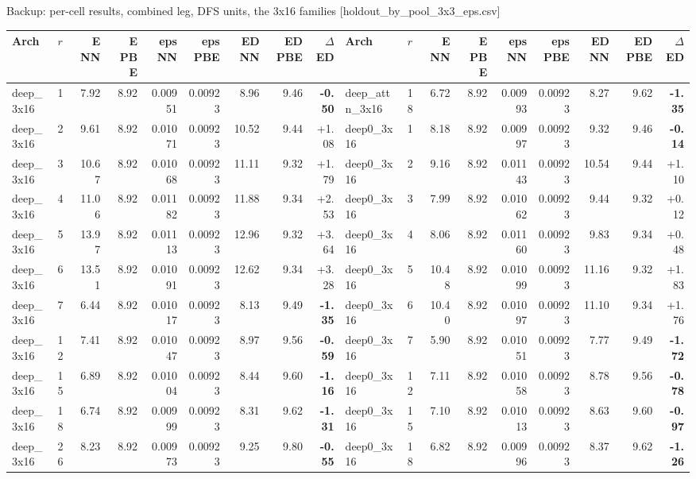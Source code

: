 \begin{frame}[label=b6]{Backup: per-cell results, combined leg, DFS units, the 3x16 families [holdout\_by\_pool\_3x3\_eps.csv]}
  \begin{center}\tiny\setlength{\tabcolsep}{2.2pt}
  \begin{tabular}{llrrrrrrr|llrrrrrrr}
  \toprule
  Arch & $r$ & E NN & E PBE & eps NN & eps PBE & ED NN & ED PBE & $\Delta$ED & Arch & $r$ & E NN & E PBE & eps NN & eps PBE & ED NN & ED PBE & $\Delta$ED \\ \midrule
  deep\_3x16 & 1 & 7.92 & 8.92 & 0.00951 & 0.00923 & 8.96 & 9.46 & \textbf{-0.50} & deep\_attn\_3x16 & 18 & 6.72 & 8.92 & 0.00993 & 0.00923 & 8.27 & 9.62 & \textbf{-1.35} \\
  deep\_3x16 & 2 & 9.61 & 8.92 & 0.01071 & 0.00923 & 10.52 & 9.44 & +1.08 & deep0\_3x16 & 1 & 8.18 & 8.92 & 0.00997 & 0.00923 & 9.32 & 9.46 & \textbf{-0.14} \\
  deep\_3x16 & 3 & 10.67 & 8.92 & 0.01068 & 0.00923 & 11.11 & 9.32 & +1.79 & deep0\_3x16 & 2 & 9.16 & 8.92 & 0.01143 & 0.00923 & 10.54 & 9.44 & +1.10 \\
  deep\_3x16 & 4 & 11.06 & 8.92 & 0.01182 & 0.00923 & 11.88 & 9.34 & +2.53 & deep0\_3x16 & 3 & 7.99 & 8.92 & 0.01062 & 0.00923 & 9.44 & 9.32 & +0.12 \\
  deep\_3x16 & 5 & 13.97 & 8.92 & 0.01113 & 0.00923 & 12.96 & 9.32 & +3.64 & deep0\_3x16 & 4 & 8.06 & 8.92 & 0.01160 & 0.00923 & 9.83 & 9.34 & +0.48 \\
  deep\_3x16 & 6 & 13.51 & 8.92 & 0.01091 & 0.00923 & 12.62 & 9.34 & +3.28 & deep0\_3x16 & 5 & 10.48 & 8.92 & 0.01099 & 0.00923 & 11.16 & 9.32 & +1.83 \\
  deep\_3x16 & 7 & 6.44 & 8.92 & 0.01017 & 0.00923 & 8.13 & 9.49 & \textbf{-1.35} & deep0\_3x16 & 6 & 10.40 & 8.92 & 0.01097 & 0.00923 & 11.10 & 9.34 & +1.76 \\
  deep\_3x16 & 12 & 7.41 & 8.92 & 0.01047 & 0.00923 & 8.97 & 9.56 & \textbf{-0.59} & deep0\_3x16 & 7 & 5.90 & 8.92 & 0.01051 & 0.00923 & 7.77 & 9.49 & \textbf{-1.72} \\
  deep\_3x16 & 15 & 6.89 & 8.92 & 0.01004 & 0.00923 & 8.44 & 9.60 & \textbf{-1.16} & deep0\_3x16 & 12 & 7.11 & 8.92 & 0.01058 & 0.00923 & 8.78 & 9.56 & \textbf{-0.78} \\
  deep\_3x16 & 18 & 6.74 & 8.92 & 0.00999 & 0.00923 & 8.31 & 9.62 & \textbf{-1.31} & deep0\_3x16 & 15 & 7.10 & 8.92 & 0.01013 & 0.00923 & 8.63 & 9.60 & \textbf{-0.97} \\
  deep\_3x16 & 26 & 8.23 & 8.92 & 0.00973 & 0.00923 & 9.25 & 9.80 & \textbf{-0.55} & deep0\_3x16 & 18 & 6.82 & 8.92 & 0.00996 & 0.00923 & 8.37 & 9.62 & \textbf{-1.26} \\

\end{tabular}
\end{center}
\end{frame}
